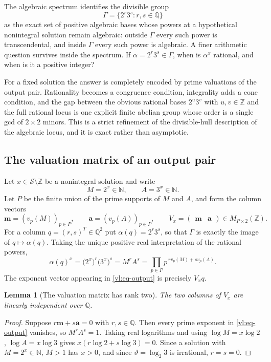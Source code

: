 \documentclass[11pt,oneside]{article}
\newtheorem{lemma}[theorem]{Lemma}
\theoremstyle{definition}
\theoremstyle{remark}
\newcommand{\N}{\mathbb N}
\newcommand{\Z}{\mathbb Z}
\newcommand{\Q}{\mathbb Q}
\newcommand{\thetaq}{\vartheta}
\newcommand{\Sol}{\mathcal S}
\newcommand{\vpp}[2]{v_{#1}\!\left(#2\right)}
\newcommand{\GammaSat}{\Gamma}
\begin{document}
The algebraic spectrum identifies the divisible group
\[
\GammaSat=\{2^r3^s:r,s\in\Q\}
\]
as the exact set of positive algebraic bases whose powers at a hypothetical nonintegral
solution remain algebraic: outside $\GammaSat$ every such power is transcendental, and inside
$\GammaSat$ every such power is algebraic.  A finer arithmetic question survives inside the
spectrum.  If $\alpha=2^r3^s\in\GammaSat$, when is $\alpha^x$ rational, and when is it a
positive integer?

For a fixed solution the answer is completely encoded by prime valuations of the output pair.
Rationality becomes a congruence condition, integrality adds a cone condition, and the gap
between the obvious rational bases $2^u3^v$ with $u,v\in\Z$ and the full rational locus is one
explicit finite abelian group whose order is a single gcd of $2\times2$ minors.  This is a
strict refinement of the divisible-hull description of the algebraic locus, and it is exact
rather than asymptotic.

\subsection{The valuation matrix of an output pair}

Let $x\in\Sol\setminus\Z$ be a nonintegral solution and write
\[
  M=2^x\in\N,\qquad A=3^x\in\N .
\]
Let $P$ be the finite union of the prime supports of $M$ and $A$, and form the column vectors
\[
  \mathbf m=(\vpp{p}{M})_{p\in P},
  \qquad
  \mathbf a=(\vpp{p}{A})_{p\in P},
  \qquad
  V_x=\begin{pmatrix}\mathbf m&\mathbf a\end{pmatrix}\in M_{P\times2}(\Z).
\]
For a column $q=(r,s)^{T}\in\Q^2$ put $\alpha(q)=2^r3^s$, so that $\GammaSat$ is exactly the
image of $q\mapsto\alpha(q)$.  Taking the unique positive real interpretation of the rational
powers,
\begin{equation}
  \alpha(q)^x=\bigl(2^x\bigr)^r\bigl(3^x\bigr)^s=M^rA^s
  =\prod_{p\in P}p^{\,r\vpp{p}{M}+s\vpp{p}{A}} .
  \label{vl:eq-output}
\end{equation}
The exponent vector appearing in \eqref{vl:eq-output} is precisely $V_xq$.

\begin{lemma}[The valuation matrix has rank two]
\label{vl:lem-rank-two}
The two columns of $V_x$ are linearly independent over $\Q$.
\end{lemma}

\begin{proof}
Suppose $r\mathbf m+s\mathbf a=0$ with $r,s\in\Q$.  Then every prime exponent in
\eqref{vl:eq-output} vanishes, so $M^rA^s=1$.  Taking real logarithms and using
$\log M=x\log2$, $\log A=x\log3$ gives $x(r\log2+s\log3)=0$.  Since a solution with
$M=2^x\in\N$, $M>1$ has $x>0$, and since $\thetaq=\log_2 3$ is irrational, $r=s=0$.
\end{proof}
\end{document}
